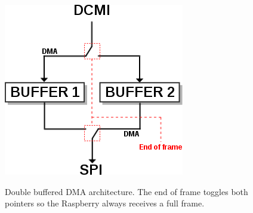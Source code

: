 \begin{figure}[ht!]
\begin{center}
\includegraphics[height=0.45\textwidth]{fig/doublebuffer}\\
\caption{Double buffered DMA architecture. The end of frame toggles both pointers so the Raspberry always receives a full frame.}
\label{fig_doublebuffer}
\end{center}
\end{figure}
